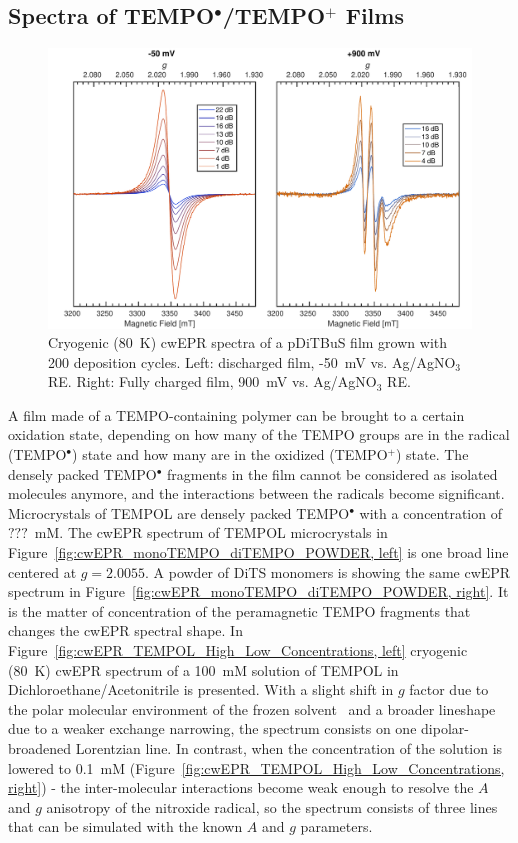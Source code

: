 \subsection{Spectra of TEMPO$^{\bullet}$/TEMPO$^{+}$ Films}
\begin{figure}[h]
\center
	\includegraphics[width=1\textwidth]{./operando_epr/figures/CRYO/S220104_CW.pdf}
	\caption{Cryogenic (80~K) cwEPR spectra of a pDiTBuS film grown with 200 deposition cycles. Left: discharged film, -50~mV vs. Ag/AgNO$_3$ RE. Right: Fully charged film, 900~mV vs. Ag/AgNO$_3$ RE.}
	\label{fig:cwEPR_CRYO_DiTBuS_DCG_vs_CHG}
\end{figure}
A film made of a TEMPO-containing polymer can be brought to a certain oxidation state, depending on how many of the TEMPO groups are in the radical (TEMPO$^{\bullet}$) state and how many are in the oxidized (TEMPO$^{+}$) state. The densely packed TEMPO$^{\bullet}$ fragments in the film cannot be considered as isolated molecules anymore, and the interactions between the radicals become significant. Microcrystals of TEMPOL are densely packed TEMPO$^{\bullet}$ with a concentration of $???$~mM. The cwEPR spectrum of TEMPOL microcrystals in Figure~\ref{fig:cwEPR_monoTEMPO_diTEMPO_POWDER, left} is one broad line centered at $g=2.0055$. A powder of DiTS monomers is showing the same cwEPR spectrum in Figure~\ref{fig:cwEPR_monoTEMPO_diTEMPO_POWDER, right}. It is the matter of concentration of the peramagnetic TEMPO fragments that changes the cwEPR spectral shape. In Figure~\ref{fig:cwEPR_TEMPOL_High_Low_Concentrations, left} cryogenic (80~K) cwEPR spectrum of a 100~mM solution of TEMPOL in Dichloroethane/Acetonitrile is presented. With a slight shift in $g$ factor due to the polar molecular environment of the frozen solvent~\cite{Siavash} and a broader lineshape due to a weaker exchange narrowing, the spectrum consists on one dipolar-broadened Lorentzian line. In contrast, when the concentration of the solution is lowered to 0.1~mM (Figure~\ref{fig:cwEPR_TEMPOL_High_Low_Concentrations, right}) - the inter-molecular interactions become weak enough to resolve the $A$ and $g$ anisotropy of the nitroxide radical, so the spectrum consists of three lines that can be simulated with the known $A$ and $g$ parameters.\\
